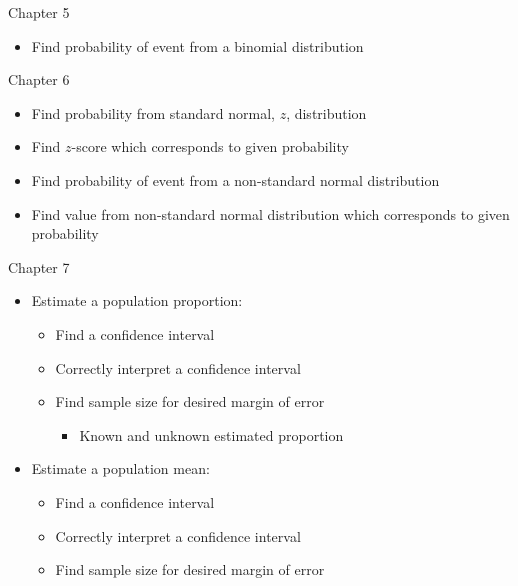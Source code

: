 \documentclass[xcolor=table]{beamer}
\begin{document}
\begin{frame}{Chapter 5}
\begin{block}{}
\large
\begin{itemize}
\item Find probability of event from a binomial distribution
\end{itemize}
\end{block}
\end{frame}

\begin{frame}{Chapter 6}
\begin{block}{}
\large
\begin{itemize}
\item Find probability from standard normal, $z$, distribution
\item Find $z$-score which corresponds to given probability
\item Find probability of event from a non-standard normal distribution
\item Find value from non-standard normal distribution which corresponds to given probability
\end{itemize}
\end{block}
\end{frame}

\begin{frame}{Chapter 7}
\begin{block}{}
\large
\begin{itemize}
\item Estimate a population proportion:
\begin{itemize}
\item Find a confidence interval 
\item Correctly interpret a confidence interval
\item Find sample size for desired margin of error
\begin{itemize}
\item Known and unknown estimated proportion
\end{itemize}
\end{itemize}
\item Estimate a population mean:
\begin{itemize}
\item Find a confidence interval 
\item Correctly interpret a confidence interval
\item Find sample size for desired margin of error
\end{itemize}
\end{itemize}
\end{block}
\end{frame}
\end{document}
